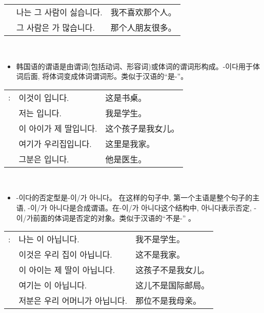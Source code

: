 \begin{grammar}
\begin{grammarsect}[\kr -이/-가]
\begin{tabular}{lll}
            &\kr 나는 그 사람이 싫습니다.&我不喜欢那个人。\\
            &\kr 그 사람은 \ruby{親舊}{친구}가 많습니다.&那个人朋友很多。
        \end{tabular}\\
    \end{grammarsect}
    \begin{grammarsect}[\kr -이다]
        \begin{itemize}
            \item 韩国语的谓语是由谓词(包括动词、形容词)或体词的谓词形构成。{\kr -이다}用于体词后面, 将体词变成体词谓词形。类似于汉语的“是-”。
        \end{itemize}
        \begin{tabular}{lll}
            \kr \ruby{例}{예}: &\kr 이것이 \ruby{冊床}{책상}입니다.&这是书桌。\\
            &\kr 저는 \ruby{學生}{학생}입니다.&我是学生。\\
            &\kr 이 아이가 제 딸입니다.&这个孩子是我女儿。\\
            &\kr 여기가 우리집입니다.&这里是我家。\\
            &\kr 그분은 \ruby{醫師}{의사}입니다.&他是医生。
        \end{tabular}\\
    \end{grammarsect}
    \begin{grammarsect}
        \begin{itemize}
            \item {\kr -이다}的否定型是{\kr -이/가 아니다}。 在这样的句子中, 第一个主语是整个句子的主语, {\kr -이/가 아니다}是合成谓语。在{\kr -이/가 아니다}这个结构中, {\kr 아니다}表示否定, {\kr -이/가}前面的体词是否定的对象。类似于汉语的“不是-” 。
        \end{itemize}
        \begin{tabular}{lll}
            \kr \ruby{例}{예}:&\kr 나는 \ruby{學生}{학생}이 아닙니다.&我不是学生。\\
            &\kr 이것은 우리 집이 아닙니다.&这不是我家。\\
            &\kr 이 아이는 제 딸이 아닙니다.&这孩子不是我女儿。\\
            &\kr 여기는 \ruby{國際郵遞局}{국제우체국}이 아닙니다.&这儿不是国际邮局。\\
            &\kr 저분은 우리 어머니가 아닙니다.&那位不是我母亲。
        \end{tabular}\\
    \end{grammarsect}
\end{grammar}
